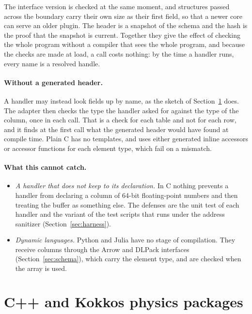 \documentclass[11pt,a4paper]{article}
\begin{document}
The interface version is checked at the same moment, and structures passed
across the boundary carry their own size as their first field, so that a
newer core can serve an older plugin.  The header is a snapshot of the
schema and the hash is the proof that the snapshot is current.  Together
they give the effect of checking the whole program without a compiler that
sees the whole program, and because the checks are made at load, a call
costs nothing: by the time a handler runs, every name is a resolved
handle.

\paragraph{Without a generated header.}  A handler may instead look fields
up by name, as the sketch of Section~\ref{sec:kokkos} does.  The adapter
then checks the type the handler asked for against the type of the column,
once in each call.  That is a check for each table and not for each row,
and it finds at the first call what the generated header would have found
at compile time.  Plain C has no templates, and uses either generated
inline accessors or accessor functions for each element type, which fail
on a mismatch.

\paragraph{What this cannot catch.}

\begin{itemize}
  \item \emph{A handler that does not keep to its declaration.}  In C
        nothing prevents a handler from declaring a column of 64-bit
        floating-point numbers and then treating the buffer as something
        else.  The defenses are the unit test of each handler and the
        variant of the test scripts that runs under the address sanitizer
        (Section~\ref{sec:harness}).
  \item \emph{Dynamic languages.}  Python and Julia have no stage of
        compilation.  They receive columns through the Arrow and DLPack
        interfaces (Section~\ref{sec:schema}), which carry the element
        type, and are checked when the array is used.
\end{itemize}

\section{C++ and Kokkos physics packages}
\label{sec:kokkos}
\end{document}
